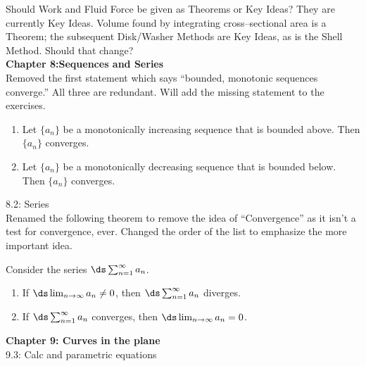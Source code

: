 \documentclass{article}
\begin{document}
Should Work and Fluid Force be given as Theorems or Key Ideas? They are currently Key Ideas. Volume found by integrating cross--sectional area is a Theorem; the subsequent Disk/Washer Methods are Key Ideas, as is the Shell Method. Should that change?\\

\noindent\large\textbf{Chapter 8:Sequences and Series}\normalsize\\

Removed the first statement which says ``bounded, monotonic sequences converge.'' All three are redundant. Will add the missing statement to the exercises.

{\begin{enumerate}
\item		Let $\{a_n\}$ be a monotonically increasing sequence that is bounded above. Then $\{a_n\}$ converges.
\item		Let $\{a_n\}$ be a monotonically decreasing sequence that is bounded below. Then $\{a_n\}$ converges.
\end{enumerate}
}

8.2: Series\\
Renamed the following theorem to remove the idea of ``Convergence'' as it isn't a test for convergence, ever. Changed the order of the list to emphasize the more important idea.
{Consider the series $\ds\sum_{n=1}^\infty a_n$. 
\begin{enumerate}
\item		If $\ds \lim_{n\to\infty}a_n \neq 0$, then $\ds\sum_{n=1}^\infty a_n$ diverges.
\item		If $\ds\sum_{n=1}^\infty a_n$ converges, then $\ds \lim_{n\to\infty}a_n =0$.
\end{enumerate}
}

\noindent\large\textbf{Chapter 9: Curves in the plane}\normalsize\\

9.3: Calc and parametric equations\\
\end{document}
